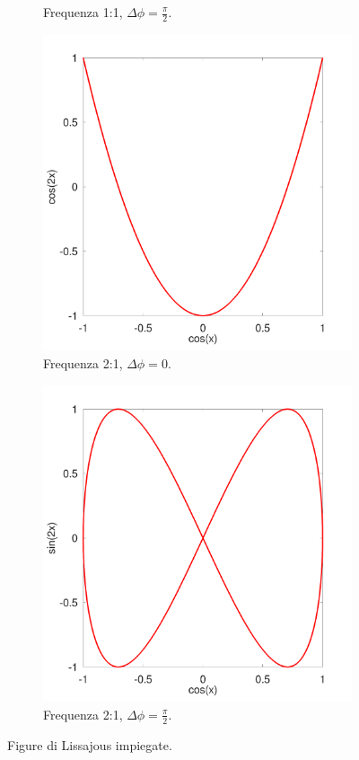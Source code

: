 \documentclass[12pt,twoside,openright]{report}
\begin{document}
\begin{figure}[h!]
\begin{subfigure}{0.48\textwidth}
    \caption{Frequenza 1:1, $\Delta \phi= \frac{\pi}{2}$.}
    \label{fig:third}
\end{subfigure}
\hfill
\begin{subfigure}{0.48\textwidth}
    \includegraphics[width=\textwidth]{lissajous4.png}
    \caption{Frequenza 2:1, $\Delta \phi= 0$.}
    \label{fig:third}
\end{subfigure}
\hfill
\begin{subfigure}{0.48\textwidth}
    \includegraphics[width=\textwidth]{lissajous3.png}
    \caption{Frequenza 2:1, $\Delta \phi= \frac{\pi}{2}$.}
    \label{fig:first}
\end{subfigure}     
\caption{Figure di Lissajous impiegate.}
\label{fig:lissajous}
\end{figure}
\end{document}
